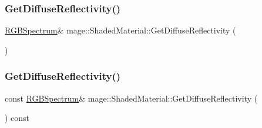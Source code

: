 \hypertarget{structmage_1_1_shaded_material_a3e292664418846588d1e5cdc9ddc8ab5}{}\label{structmage_1_1_shaded_material_a3e292664418846588d1e5cdc9ddc8ab5} 
\subsubsection{\texorpdfstring{Get\+Diffuse\+Reflectivity()}{GetDiffuseReflectivity()}\hspace{0.1cm}{\footnotesize\ttfamily [1/2]}}
{\footnotesize\ttfamily \hyperlink{structmage_1_1_r_g_b_spectrum}{R\+G\+B\+Spectrum}\& mage\+::\+Shaded\+Material\+::\+Get\+Diffuse\+Reflectivity (\begin{DoxyParamCaption}{ }\end{DoxyParamCaption})\hspace{0.3cm}{\ttfamily [noexcept]}}

\hypertarget{structmage_1_1_shaded_material_ae2c5d441c51b40a3c940785a002f59ec}{}\label{structmage_1_1_shaded_material_ae2c5d441c51b40a3c940785a002f59ec} 
\subsubsection{\texorpdfstring{Get\+Diffuse\+Reflectivity()}{GetDiffuseReflectivity()}\hspace{0.1cm}{\footnotesize\ttfamily [2/2]}}
{\footnotesize\ttfamily const \hyperlink{structmage_1_1_r_g_b_spectrum}{R\+G\+B\+Spectrum}\& mage\+::\+Shaded\+Material\+::\+Get\+Diffuse\+Reflectivity (\begin{DoxyParamCaption}{ }\end{DoxyParamCaption}) const\hspace{0.3cm}{\ttfamily [noexcept]}}

\hypertarget{structmage_1_1_shaded_material_a4e163bd276e41b01973a5d968f6f5716}{}\label{structmage_1_1_shaded_material_a4e163bd276e41b01973a5d968f6f5716} 

